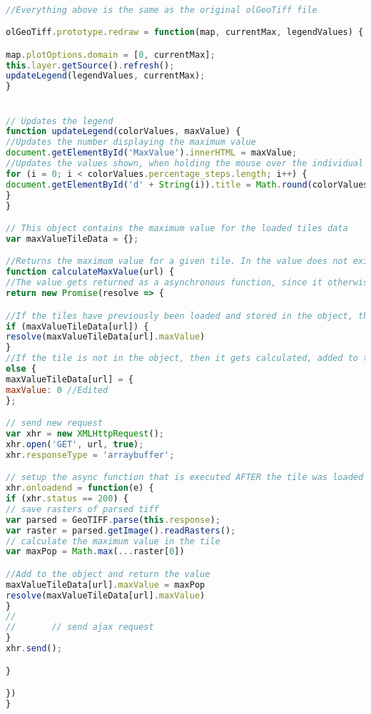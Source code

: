 \begin{lstlisting}[language=JavaScript, caption={Additions to olGeoTiff.js. The original code can be found at \citet{olGeoTiffSource}}, label= VoresJS,escapechar=|]

//Everything above is the same as the original olGeoTiff file

olGeoTiff.prototype.redraw = function(map, currentMax, legendValues) {

map.plotOptions.domain = [0, currentMax];
this.layer.getSource().refresh();
updateLegend(legendValues, currentMax);
}


// Updates the legend
function updateLegend(colorValues, maxValue) {
//Updates the number displaying the maximum value
document.getElementById('MaxValue').innerHTML = maxValue;
//Updates the values shown, when holding the mouse over the individual color classes
for (i = 0; i < colorValues.percentage_steps.length; i++) {
document.getElementById('d' + String(i)).title = Math.round(colorValues.percentage_steps[i] * maxValue)
}
}

// This object contains the maximum value for the loaded tiles data
var maxValueTileData = {};

//Returns the maximum value for a given tile. In the value does not exist it will be calculated and added to the object
function calculateMaxValue(url) {
//The value gets returned as a asynchronous function, since it otherwise would return undefined
return new Promise(resolve => {

//If the tiles have previously been loaded and stored in the object, then it is returned
if (maxValueTileData[url]) {
resolve(maxValueTileData[url].maxValue)
}
//If the tile is not in the object, then it gets calculated, added to the object and then returned
else {
maxValueTileData[url] = {
maxValue: 0 //Edited
};

// send new request
var xhr = new XMLHttpRequest();
xhr.open('GET', url, true);
xhr.responseType = 'arraybuffer';

// setup the async function that is executed AFTER the tile was loaded
xhr.onloadend = function(e) {
if (xhr.status == 200) {
// save rasters of parsed tiff
var parsed = GeoTIFF.parse(this.response);
var raster = parsed.getImage().readRasters();
// calculate the maximum value in the tile
var maxPop = Math.max(...raster[0])

//Add to the object and return the value
maxValueTileData[url].maxValue = maxPop
resolve(maxValueTileData[url].maxValue)
}
//
//       // send ajax request
}
xhr.send();

}

})
}
\end{lstlisting}



